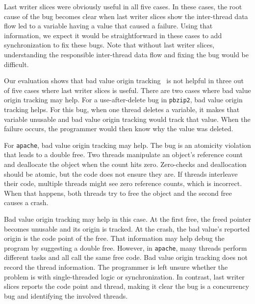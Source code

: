 \documentclass[preprint,9pt]{sigplanconf}
\begin{document}
Last writer slices were obviously useful in all five cases.  In these cases,
the root cause of the bug becomes clear when last writer slices show the
inter-thread data flow led to a variable having a value that caused a failure.
Using that information, we expect it would be straightforward in these cases to
add synchronization to fix these bugs.  Note that without last writer slices,
understanding the responsible inter-thread data flow and fixing the bug would
be difficult.  

Our evaluation shows that bad value origin tracking~\cite{badapples} is not
helpful in three out of five cases where last writer slices is useful.  
There are two cases where bad value origin tracking may help.  For a
use-after-delete bug in {\tt pbzip2}, bad value origin tracking helps.  For
this bug, when one thread deletes a variable, it makes that variable unusable
and bad value origin tracking would track that value.  When the failure occurs,
the programmer would then know why the value was deleted.  

For {\tt apache}, bad value origin tracking may help.  The bug is an atomicity
violation that leads to a double free.  Two threads manipulate an object's
reference count and deallocate the object when the count hits zero. Zero-checks
and deallocation should be atomic, but the code does not ensure they are.  If
threads interleave their code, multiple threads might see zero reference
counts, which is incorrect.  When that happens, both threads try to free the
object and the second free causes a crash.  

Bad value origin tracking may help in this case.  At the first free, the freed
pointer becomes unusable and its origin is tracked.  At the crash, the bad
value's reported origin is the code point of the free. That information may
help debug the program by suggesting a double free.  However, in {\tt apache},
many threads perform different tasks and all call the same free code.  Bad
value origin tracking does not record the thread information.  The programmer
is left unsure whether the problem is with single-threaded logic or
synchronization.  In contrast, last writer slices reports the code point and
thread, making it clear the bug is a concurrency bug and identifying the
involved threads.
\end{document}
